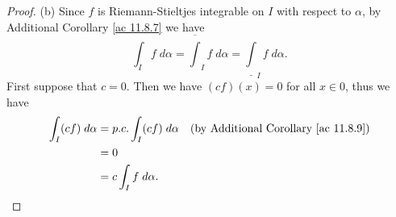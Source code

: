 \begin{proof}{(b)}
    Since \(f\) is Riemann-Stieltjes integrable on \(I\) with respect to \(\alpha\), by Additional Corollary \ref{ac 11.8.7} we have
    \[
        \int_I f \; d \alpha = \overline{\int}_I f \; d \alpha = \underline{\int}_I f \; d \alpha.
    \]
    First suppose that \(c = 0\).
    Then we have \((cf)(x) = 0\) for all \(x \in 0\), thus we have
    \begin{align*}
        \int_I (cf) \; d \alpha & = p.c. \int_I (cf) \; d \alpha & \text{(by Additional Corollary \ref{ac 11.8.9})} \\
                                & = 0                                                                               \\
                                & = c \int_I f \; d \alpha.
    \end{align*}


\end{proof}
